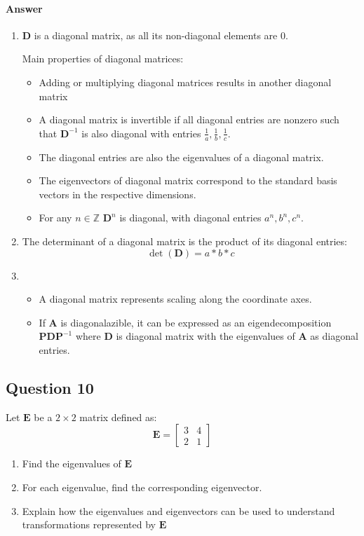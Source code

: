\documentclass{article}
\begin{document}
\paragraph{Answer}
\begin{enumerate}
    \item $ \mathbf{D} $ is a diagonal matrix, as all its non-diagonal elements are $0$.
    
    Main properties of diagonal matrices:
    \begin{itemize}
        \item Adding or multiplying diagonal matrices results in another diagonal matrix
        \item A diagonal matrix is invertible if all diagonal entries are nonzero such that $ \mathbf{D}^{-1} $ is also diagonal with entries $\frac{1}{a}, \frac{1}{b}, \frac{1}{c}$.
        \item The diagonal entries are also the eigenvalues of a diagonal matrix.
        \item The eigenvectors of diagonal matrix correspond to the standard basis vectors in the respective dimensions.
        \item For any $n \in \mathbb{Z}$ $ \mathbf{D}^n$ is diagonal, with diagonal entries $a^n, b^n, c^n$.
    \end{itemize}
    \item The determinant of a diagonal matrix is the product of its diagonal entries:
    $$ \det (\mathbf{D}) = a*b*c$$
    \item \begin{itemize}
        \item A diagonal matrix represents scaling along the coordinate axes.
        \item If $\mathbf{A}$ is diagonalazible, it can be expressed as an eigendecomposition $\mathbf{P}\mathbf{D}\mathbf{P}^{-1}$ where $\mathbf{D}$ is diagonal matrix with the eigenvalues of $\mathbf{A}$ as diagonal entries.
    \end{itemize}
\end{enumerate}

\subsection{Question 10}
Let $ \mathbf{E} $ be a $ 2 \times 2 $ matrix defined as:
$$
\mathbf{E} =  \left[ \begin{array}{cc} 3 & 4 \\ 2 & 1 \end{array} \right]
$$
\begin{enumerate}
    \item Find the eigenvalues of $\mathbf{E}$
    \item For each eigenvalue, find the corresponding eigenvector.
    \item Explain how the eigenvalues and eigenvectors can be used to understand transformations represented by $\mathbf{E}$
\end{enumerate}
\end{document}
